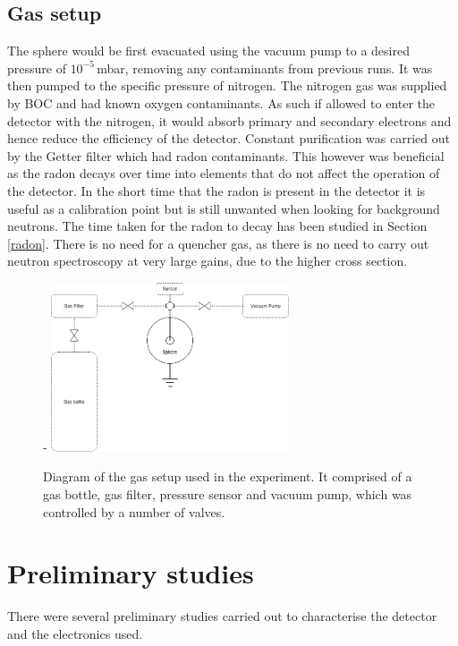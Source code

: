 \documentclass[a4paper]{article}
\begin{document}
\subsection{Gas setup} \label{Gass}
The sphere would be first evacuated using the vacuum pump to a desired pressure of $10^{-5}$\,mbar, removing any contaminants from previous runs. It was then pumped to the specific pressure of nitrogen. The nitrogen gas was supplied by BOC and had known oxygen contaminants. As such if allowed to enter the detector with the nitrogen, it would absorb primary and secondary electrons and hence reduce the efficiency of the detector. Constant purification was carried out by the Getter filter which had radon contaminants. This however was beneficial as the radon decays over time into elements that do not affect the operation of the detector. In the short time that the radon is present in the detector it is useful as a calibration point but is still unwanted when looking for background neutrons. The time taken for the radon to decay has been studied in Section \ref{radon}.
\newline There is no need for a quencher gas, as there is no need to carry out neutron spectroscopy at very large gains, due to the higher cross section.
\begin{figure}[H]-
    \centering
    \includegraphics[height=5cm]{gas.png}
    \caption{Diagram of the gas setup used in the experiment. It comprised of a gas bottle, gas filter, pressure sensor and vacuum pump, which was controlled by a number of valves.}
    \label{fig:gas}
\end{figure}
\section{Preliminary studies}
There were several preliminary studies carried out to characterise the detector and the electronics used.
\end{document}
